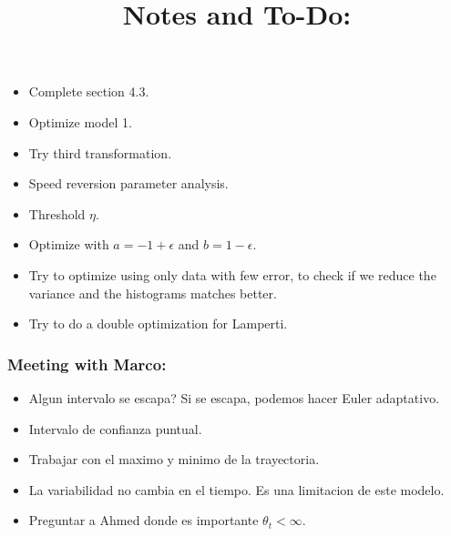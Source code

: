\documentclass[12pt]{article}
\begin{document}
\title{Notes and To-Do:}
\maketitle

\begin{itemize}

\item Complete section 4.3.
\item Optimize model 1.
\item Try third transformation.
\item Speed reversion parameter analysis.
\item Threshold $\eta$.
\item Optimize with $a=-1+\epsilon$ and $b=1-\epsilon$.
\item Try to optimize using only data with few error, to check if we reduce the variance and the histograms matches better.
\item Try to do a double optimization for Lamperti.

\end{itemize}

\subsubsection*{Meeting with Marco:}

\begin{itemize}

\item Algun intervalo se escapa? Si se escapa, podemos hacer Euler adaptativo.
\item Intervalo de confianza puntual.
\item Trabajar con el maximo y minimo de la trayectoria.
\item La variabilidad no cambia en el tiempo. Es una limitacion de este modelo.
\item Preguntar a Ahmed donde es importante $\theta_t<\infty$.

\end{itemize}
\end{document}
